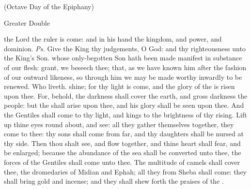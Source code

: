 
\centerline{(Octave Day of the Epiphany)}

\begin{inhead}
{Greater Double}
\end{inhead}
\par\noindent
{}


\introit
{} the Lord the ruler is come: and in his hand the kingdom, and power, and dominion. \textit{Ps.} Give the King thy judgements, O God: and thy righteousness unto the King's Son.
\collect
{} whose only-begotten Son hath been made manifest in substance of our flesh: grant, we beseech thee; that, as we have known him after the fashion of our outward likeness, so through him we may be made worthy inwardly to be renewed. Who liveth.
 shine; for thy light is come, and the glory of the  is risen upon thee. For, behold, the darkness shall cover the earth, and gross darkness the people: but the  shall arise upon thee, and his glory shall be seen upon thee. And the Gentiles shall come to thy light, and kings to the brightness of thy rising. Lift up thine eyes round about, and see: all they gather themselves together, they come to thee: thy sons shall come from far, and thy daughters shall be nursed at thy side. Then thou shalt see, and flow together, and thine heart shall fear, and be enlarged; because the abundance of the sea shall be converted unto thee, the forces of the Gentiles shall come unto thee. The multitude of camels shall cover thee, the dromedaries of Midian and Ephah; all they from Sheba shall come: they shall bring gold and incense; and they shall shew forth the praises of the .

